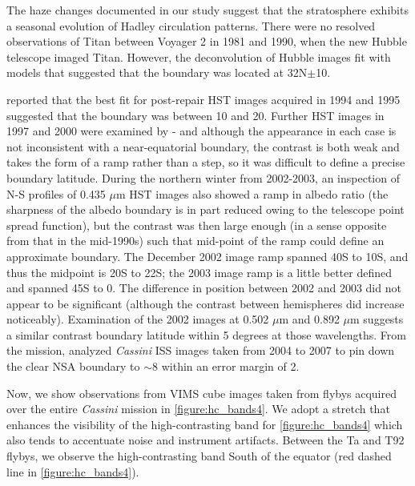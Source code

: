 \documentclass[apj,tighten]{emulateapj}
\begin{document}
The haze changes documented in our study suggest that the stratosphere exhibits a seasonal evolution of Hadley circulation patterns.
There were no resolved observations of Titan between Voyager 2 in 1981 and 1990, when the new Hubble telescope imaged Titan.
However, the deconvolution of Hubble images fit with models \citep{caldwell1992titan} that suggested that the boundary was located at 32\degree{}N$\pm$10\degree{}.

\cite{lorenz1997titan} reported that the best fit for post-repair HST images acquired in 1994 and 1995 suggested that the boundary was between 10 and 20.
Further HST images in 1997 and 2000 were examined by \cite{lorenz2004seasonal} - and although the appearance in each case is not inconsistent with a near-equatorial boundary, the contrast is both weak and takes the form of a ramp rather than a step, so it was difficult to define a precise boundary latitude.
During the northern winter from 2002-2003, an inspection of N-S profiles of 0.435 $\mu$m HST images \cite{lorenz2006seasonal} also showed a ramp in albedo ratio (the sharpness of the albedo boundary is in part reduced owing to the telescope point spread function), but the contrast was then large enough (in a sense opposite from that in the mid-1990s) such that mid-point of the ramp could define an approximate boundary. 
The December 2002 image ramp spanned 40\degree{}S to 10\degree{}S, and thus the midpoint is 20\degree{}S to 22\degree{}S; the 2003 image ramp is a little better defined and spanned 45\degree{}S to 0\degree{}.
The difference in position between 2002 and 2003 did not appear to be significant (although the contrast between hemispheres did increase noticeably).
Examination of the 2002 images at 0.502 $\mu$m and 0.892 $\mu$m suggests a similar contrast boundary latitude within 5 degrees at those wavelengths.
From the mission, \cite{Roman2009} analyzed \textit{Cassini} ISS images taken from 2004 to 2007 to pin down the clear NSA boundary to $\sim$8 within an error margin of 2\degree{}.

Now, we show observations from VIMS cube images taken from flybys acquired over the entire \textit{Cassini} mission in \autoref{figure:hc_bands4}.
We adopt a stretch that enhances the visibility of the high-contrasting band for \autoref{figure:hc_bands4} which also tends to accentuate noise and instrument artifacts.
Between the Ta and T92 flybys, we observe the high-contrasting band South of the equator (red dashed line in \autoref{figure:hc_bands4}). 
\end{document}

